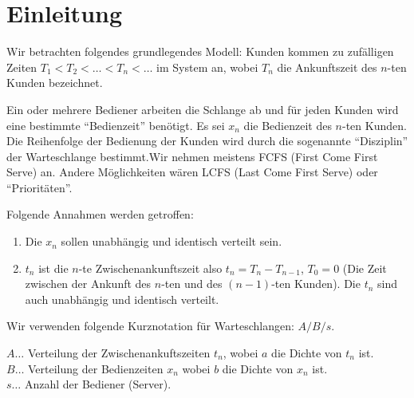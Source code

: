 \chapter{Einleitung}
Wir betrachten folgendes grundlegendes Modell:  Kunden kommen zu
zufälligen Zeiten  $T_{1} < T_{2} < \dots <T_{n} < \dots$ im System an,
wobei $T_{n}$
die Ankunftszeit des $n$-ten Kunden bezeichnet.

Ein oder mehrere Bediener arbeiten die Schlange ab und für jeden Kunden
wird eine bestimmte \enquote{Bedienzeit} benötigt. Es sei $x_{n}$ die Bedienzeit
des $n$-ten Kunden.
Die Reihenfolge der Bedienung der Kunden wird durch
die sogenannte \enquote{Disziplin} der Warteschlange bestimmt.Wir nehmen meistens
FCFS (First Come First Serve) an. Andere Möglichkeiten wären LCFS (Last
Come First Serve) oder \enquote{Prioritäten}.

Folgende Annahmen werden getroffen:
\begin{enumerate}
\item Die $x_{n}$ sollen unabhängig und identisch verteilt sein.
\item $t_{n}$ ist die $n$-te Zwischenankunftszeit also $t_{n}= T_{n} -
T_{n-1}$,  $T_{0}=0$ (Die Zeit zwischen der Ankunft des $n$-ten und des
$(n-1)$-ten Kunden). Die $t_{n}$ sind auch unabhängig und identisch
verteilt.
\end{enumerate}
Wir verwenden folgende Kurznotation für
Warteschlangen: $A/B/s$.

$A \dots$ Verteilung der Zwischenankuftszeiten $t_{n}$, wobei $a$ die Dichte
von $t_{n}$ ist. \\
$B \dots$ Verteilung der Bedienzeiten $x_{n}$ wobei $b$ die Dichte von
$x_{n}$ ist. \\
$s \dots$ Anzahl der Bediener (Server).

